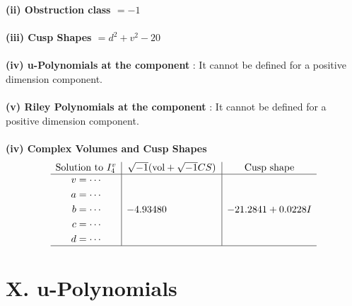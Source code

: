 \documentclass[1p]{elsarticle_modified}
\theoremstyle{definition}
\newcommand{\I}{\sqrt{-1}}
\begin{document}
\flushleft \textbf{(ii) Obstruction class $= -1$}\\~\\
\flushleft \textbf{(iii) Cusp Shapes $= d^2+v^2-20$}\\~\\
\flushleft \textbf{(iv) u-Polynomials at the component} : It cannot be defined for a positive dimension component.\\~\\
\flushleft \textbf{(v) Riley Polynomials at the component} : It cannot be defined for a positive dimension component.\\~\\
\newpage\flushleft \textbf{(iv) Complex Volumes and Cusp Shapes}
$$\begin{array}{c|c|c} 
\text{Solution to }I^v_{4}& \I (\text{vol} + \sqrt{-1}CS) & \text{Cusp shape}\\
 \hline 
\begin{aligned}
v &= \cdots \\
a &= \cdots \\
b &= \cdots \\
c &= \cdots \\
d &= \cdots\end{aligned}
 & -4.93480\phantom{ +0.000000I} & -21.2841 + 0.0228 I\\
 \hline 
 \end{array}
$$
\newpage\renewcommand{\arraystretch}{1}
\centering \section*{ X. u-Polynomials}
\end{document}
